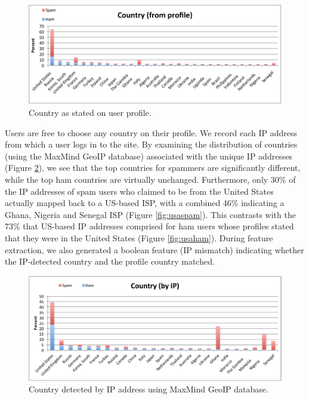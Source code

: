 \documentclass[preprint]{acm_proc_article-sp}
\begin{document}
\begin{figure}[h]
    \centering
    \includegraphics[width=\linewidth]{figures/country-prof.pdf}
    \caption{Country as stated on user profile.}
    \label{fig:cprof}
\end{figure}

Users are free to choose any country on their profile. We record each IP address from which a 
user logs in to the site. By examining the distribution of countries (using the MaxMind GeoIP 
database) associated with the unique IP addresses (Figure \ref{fig:cip}), we see that the top 
countries for spammers are significantly different, while the top ham countries are 
virtually unchanged. Furthermore, only 30\% of the IP addresses of spam users who 
claimed to be from the United States actually mapped back to a US-based ISP, with a combined 
46\% indicating a Ghana, Nigeria and Senegal ISP (Figure \ref{fig:usaspam}). This contrasts 
with the 73\% that US-based IP addresses comprised for ham users whose profiles stated that 
they were in the United States (Figure \ref{fig:usaham}). During feature extraction, we also 
generated a boolean feature (IP mismatch) indicating whether the IP-detected country and 
the profile country matched. 

\begin{figure}[h]
    \centering
    \includegraphics[width=\linewidth]{figures/country-ip.pdf}
    \caption{Country detected by IP address using MaxMind GeoIP database.}
    \label{fig:cip}
\end{figure}
\end{document}
